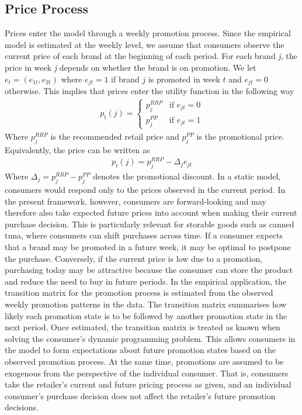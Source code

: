 \newpage
\subsection{Price Process}
Prices enter the model through a weekly promotion process. Since the empirical model is estimated at the weekly level, we assume that consumers observe the current price of each brand at the beginning of each period. For each brand \textit{j}, the price in week \textit{j} depends on whether the brand is on promotion. We let $e_t = (e_{1t},e_{2t})$ where $e_{jt} = 1$ if brand $j$ is promoted in week $t$ and $e_{jt} = 0$ otherwise. 
This implies that prices enter the utility function in the following way
\begin{align*}
    p_t(j) =
    \begin{cases}
        p_j^{RRP} & \text{if } e_{jt} = 0 \\
        p_j^{PP} & \text{if } e_{jt} = 1
    \end{cases}
\end{align*}
Where $p_j^{RRP}$ is the recommended retail price and $p_j^{PP}$ is the promotional price. Equivalently, the price can be written as
\begin{align*}
    p_t(j) = p_j^{RRP} - \Delta_j e_{jt}
\end{align*}
Where $\Delta_j = p_j^{RRP} - p_j^{PP}$ denotes the promotional discount. 
In a static model, consumers would respond only to the prices observed in the current period. In the present framework, however, consumers are forward-looking and may therefore also take expected future prices into account when making their current purchase decision. This is particularly relevant for storable goods such as canned tuna, where consumers can shift purchases across time. If a consumer expects that a brand may be promoted in a future week, it may be optimal to postpone the purchase. Conversely, if the current price is low due to a promotion, purchasing today may be attractive because the consumer can store the product and reduce the need to buy in future periods. In the empirical application, the transition matrix for the promotion process is estimated from the observed weekly promotion patterns in the data. The transition matrix summarises how likely each promotion state is to be followed by another promotion state in the next period. Once estimated, the transition matrix is treated as known when solving the consumer's dynamic programming problem. This allows consumers in the model to form expectations about future promotion states based on the observed promotion process. At the same time, promotions are assumed to be exogenous from the perspective of the individual consumer. That is, consumers take the retailer's current and future pricing process as given, and an individual consumer's purchase decision does not affect the retailer's future promotion decisions.

